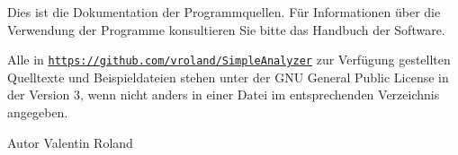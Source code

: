 Dies ist die Dokumentation der Programmquellen. Für Informationen über die Verwendung der Programme konsultieren Sie bitte das Handbuch der Software.

Alle in \href{https://github.com/vroland/SimpleAnalyzer}{\tt https\-://github.\-com/vroland/\-Simple\-Analyzer} zur Verfügung gestellten Quelltexte und Beispieldateien stehen unter der G\-N\-U General Public License in der Version 3, wenn nicht anders in einer Datei im entsprechenden Verzeichnis angegeben.

\begin{DoxyAuthor}{Autor}
Valentin Roland 
\end{DoxyAuthor}
